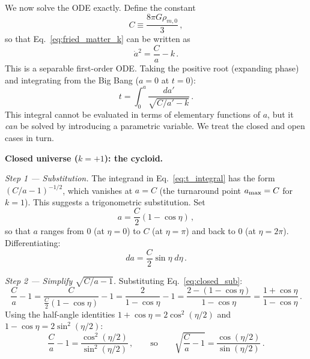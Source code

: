 We now solve the ODE exactly. Define the constant
\begin{equation}\label{eq:C_def}
    C \equiv \frac{8\pi G\rho_{m,0}}{3}\,,
\end{equation}
so that Eq.~\eqref{eq:fried_matter_k} can be written as
\begin{equation}\label{eq:adot_sq}
    \dot{a}^2 = \frac{C}{a} - k\,.
\end{equation}
This is a separable first-order ODE. Taking the positive root (expanding phase) and integrating from the Big Bang ($a=0$ at $t=0$):
\begin{equation}\label{eq:t_integral}
    t = \int_0^{a}\frac{da'}{\sqrt{C/a'-k}}\,.
\end{equation}
This integral cannot be evaluated in terms of elementary functions of $a$, but it \emph{can} be solved by introducing a parametric variable. We treat the closed and open cases in turn.

\medskip\noindent\textbf{Closed universe ($k=+1$): the cycloid.}

\medskip\noindent\emph{Step 1 --- Substitution.} The integrand in Eq.~\eqref{eq:t_integral} has the form $(C/a-1)^{-1/2}$, which vanishes at $a=C$ (the turnaround point $a_{\rm max}=C$ for $k=1$). This suggests a trigonometric substitution. Set
\begin{equation}\label{eq:closed_sub}
    a = \frac{C}{2}(1-\cos\eta)\,,
\end{equation}
so that $a$ ranges from $0$ (at $\eta=0$) to $C$ (at $\eta=\pi$) and back to $0$ (at $\eta=2\pi$). Differentiating:
\begin{equation}
    da = \frac{C}{2}\sin\eta\;d\eta\,.
\end{equation}

\medskip\noindent\emph{Step 2 --- Simplify $\sqrt{C/a-1}$.} Substituting Eq.~\eqref{eq:closed_sub}:
\begin{equation}
    \frac{C}{a} - 1 = \frac{C}{\frac{C}{2}(1-\cos\eta)} - 1
    = \frac{2}{1-\cos\eta} - 1
    = \frac{2-(1-\cos\eta)}{1-\cos\eta}
    = \frac{1+\cos\eta}{1-\cos\eta}\,.
\end{equation}
Using the half-angle identities $1+\cos\eta = 2\cos^2(\eta/2)$ and $1-\cos\eta = 2\sin^2(\eta/2)$:
\begin{equation}
    \frac{C}{a}-1 = \frac{\cos^2(\eta/2)}{\sin^2(\eta/2)}\,,
    \qquad\text{so}\qquad
    \sqrt{\frac{C}{a}-1} = \frac{\cos(\eta/2)}{\sin(\eta/2)}\,.
\end{equation}

